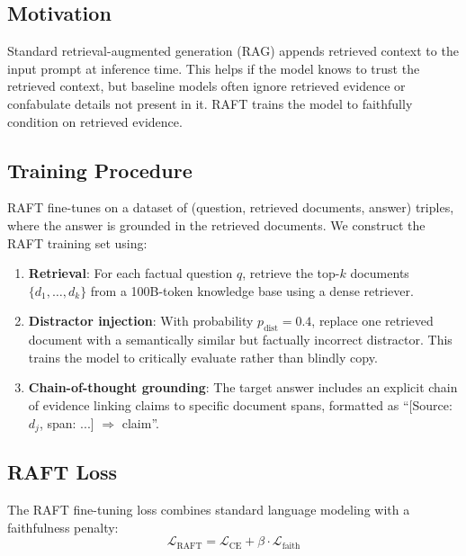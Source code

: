 \documentclass[11pt,a4paper]{article}
\begin{document}
\subsection{Motivation}

Standard retrieval-augmented generation (RAG) appends retrieved context to the input
prompt at inference time. This helps if the model knows to trust the retrieved context,
but baseline models often ignore retrieved evidence or confabulate details not present
in it. RAFT trains the model to faithfully condition on retrieved evidence.

\subsection{Training Procedure}

RAFT fine-tunes on a dataset of (question, retrieved documents, answer) triples, where
the answer is grounded in the retrieved documents. We construct the RAFT training set
using:

\begin{enumerate}
    \item \textbf{Retrieval}: For each factual question $q$, retrieve the top-$k$ documents
          $\{d_1, \ldots, d_k\}$ from a 100B-token knowledge base using a dense retriever.
    \item \textbf{Distractor injection}: With probability $p_{\text{dist}} = 0.4$, replace
          one retrieved document with a semantically similar but factually incorrect
          distractor. This trains the model to critically evaluate rather than blindly copy.
    \item \textbf{Chain-of-thought grounding}: The target answer includes an explicit
          chain of evidence linking claims to specific document spans, formatted as
          ``[Source: $d_j$, span: ...] $\Rightarrow$ claim''.
\end{enumerate}

\subsection{RAFT Loss}

The RAFT fine-tuning loss combines standard language modeling with a faithfulness penalty:
\begin{equation}
    \mathcal{L}_{\text{RAFT}} = \mathcal{L}_{\text{CE}} + \beta \cdot \mathcal{L}_{\text{faith}}
    \label{eq:raft_loss}
\end{equation}
\end{document}

